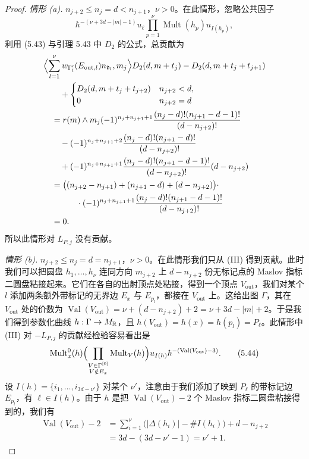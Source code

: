 \begin{proof}
\textit{情形 (a).} $n_{j+2}\le n_j=d<n_{j+1}$，$\nu>0$。在此情形，忽略公共因子
\[
  \hbar^{-(\nu+3d-|m|-1)}u_\ell\prod_{p=1}^{\nu}\operatorname{Mult}(h_p)u_{I(h_p)},
\]
利用 (5.43) 与引理 5.43 中 $D_2$ 的公式，总贡献为
\[
  \begin{aligned}
    &\Bigl\langle\sum_{l=1}^{\nu}w_{\Gamma'_l}(E_{\mathrm{out},l})n_{\mathfrak d_l},m_j\Bigr\rangle D_2(d,m+t_j)-D_2(d,m+t_j+t_{j+1})\\
    &\qquad+\begin{cases}
      D_2(d,m+t_j+t_{j+2}) & n_{j+2}<d,\\
      0 & n_{j+2}=d
    \end{cases}\\
    &\quad=r(m)\wedge m_j(-1)^{n_j+n_{j+1}+1}\frac{(n_j-d)!(n_{j+1}-d-1)!}{(d-n_{j+2})!}\\
    &\qquad-(-1)^{n_j+n_{j+1}+2}\frac{(n_j-d)!(n_{j+1}-d)!}{(d-n_{j+2})!}\\
    &\qquad+(-1)^{n_j+n_{j+1}+1}\frac{(n_j-d)!(n_{j+1}-d-1)!}{(d-n_{j+2})!}(d-n_{j+2})\\
    &\quad=\bigl((n_{j+2}-n_{j+1})+(n_{j+1}-d)+(d-n_{j+2})\bigr)\cdot\\
    &\qquad\qquad\cdot(-1)^{n_j+n_{j+1}+1}\frac{(n_j-d)!(n_{j+1}-d-1)!}{(d-n_{j+2})!}\\
    &\quad=0.
  \end{aligned}
\]
所以此情形对 $L_{P,j}$ 没有贡献。


\textit{情形 (b).} $n_{j+2}\le n_j=d=n_{j+1}$，$\nu>0$。在此情形我们只从 (III) 得到贡献。此时我们可以把圆盘 $h_1,\ldots,h_\nu$ 连同方向 $m_{j+2}$ 上 $d-n_{j+2}$ 份无标记点的 Maslov 指标二圆盘粘接起来。它们在各自的出射顶点处粘接，得到一个顶点 $V_{\mathrm{out}}$，我们对某个 $l$ 添加两条额外带标记的无界边 $E_x$ 与 $E_{p_l}$，都接在 $V_{\mathrm{out}}$ 上。这给出图 $\Gamma$，其在 $V_{\mathrm{out}}$ 处的价数为 $\operatorname{Val}(V_{\mathrm{out}})=\nu+(d-n_{j+2})+2=\nu+3d-|m|+2$。于是我们得到参数化曲线 $h:\Gamma\to M_{\mathbb{R}}$，且 $h(V_{\mathrm{out}})=h(x)=h(p_l)=P_\ell$。此情形中 (III) 对 $-L_{P,j}$ 的贡献经检验容易看出是
\begin{equation}
  \operatorname{Mult}^0_x(h)\Bigl(\prod_{\substack{V\in\Gamma^{[0]}\\ V\notin E_x}}\operatorname{Mult}_V(h)\Bigr)
  u_{I(h)}\hbar^{-(\operatorname{Val}(V_{\mathrm{out}})-3)}. \tag{5.44}
\end{equation}
设 $I(h)=\{i_1,\ldots,i_{3d-\nu'}\}$ 对某个 $\nu'$，注意由于我们添加了映到 $P_\ell$ 的带标记边 $E_{p_l}$，有 $\ell\in I(h)$。由于 $h$ 是把 $\operatorname{Val}(V_{\mathrm{out}})-2$ 个 Maslov 指标二圆盘粘接得到的，我们有
\[
  \begin{aligned}
    \operatorname{Val}(V_{\mathrm{out}})-2
    &=\sum_{i=1}^{\nu}\bigl(|\Delta(h_i)|-\#I(h_i)\bigr)+d-n_{j+2}\\
    &=3d-(3d-\nu'-1)=\nu'+1.
  \end{aligned}
\]


\end{proof}
